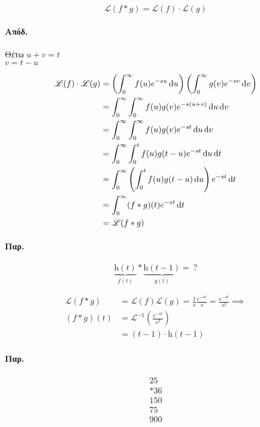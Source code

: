 \documentclass[11pt,a4paper,titlepage,final]{article}
\begin{document}
\begin{theorem*}{}
\[
\mathscr L \left(
f * g
\right) = \mathscr L(f) \cdot \mathscr L(g)
\]
\end{theorem*}
\paragraph{Απόδ.}
Θέτω \(u+v=t\) \\ \(v=t-u\)

\begin{align*}
\mathscr L(f) \cdot \mathscr L(g) &=
\left(
\int_0^\infty f(u) e^{-su} \dif u
\right)\left(
\int_0^\infty g(v)e^{-sv}\dif v
\right)
\\
&=
\int_0^\infty \int_0^\infty f(u)g(v)e^{-s(u+v)}\dif u \dif v
\\ &=
\int_0^\infty \int_0^\infty f(u)g(v) e^{-st} \dif u \dif v
\\ &= \int_0^\infty \int_0^t f(u)g(t - u)e^{-st} \dif u \dif t
\\ &= \int_0^\infty \left(
\int_0^t f(u) g(t-u) \dif u
\right) e^{-st} \dif t
\\ &= \int_0^\infty (f*g)(t)e^{-st} \dif t\\
&= \mathscr L(f*g)
\end{align*}

\paragraph{Παρ.}
\[
\underbrace{\mathrm h(t)}_{f(t)} * \underbrace{\mathrm h(t-1)}_{g(t)} =\ ?
\]

\begin{align*}
\mathscr L(f*g) &= \mathscr L(f) \mathscr L(g) = \frac{1}{s} \frac{e^{-st}}{s} = 
\frac{e^{-st}}{s^2} \implies \\
(f*g)(t) &= \mathscr L^{-1} \left(
\frac{e^{-st}}{s^2}
\right) \\
&= (t-1) \cdot \mathrm h(t-1)
\end{align*}


\paragraph{Παρ.}
\[
\begin{array}{rr}
25 \\ *36 \\ \hline 150 \\ 75\ \\ \hline 900
\end{array}
\]
\end{document}
